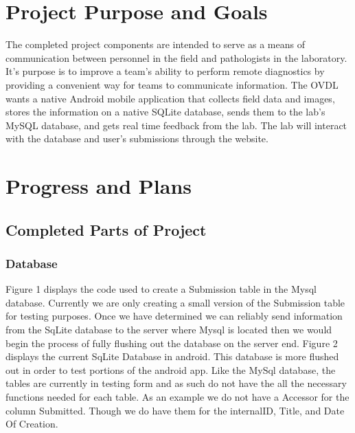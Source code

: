 \documentclass[onecolumn, draftclsnofoot,10pt, compsoc]{IEEEtran}
\begin{document}
\begin{titlepage}
\begin{singlespace}
\begin{abstract}
        \end{abstract}     
    \end{singlespace}
\end{titlepage}
\newpage
{}
\tableofcontents
\clearpage

\section{Project Purpose and Goals}
The completed project components are intended to serve as a means of communication between personnel in the field and pathologists in the laboratory. It's purpose is to improve a team's ability to perform remote diagnostics by providing a convenient way for teams to communicate information. The OVDL wants a native Android mobile application that collects field data and images, stores the information on a native SQLite database, sends them to the lab’s MySQL database, and gets real time feedback from the lab. The lab will interact with the database and user's submissions through the website.

\section{Progress and Plans}
\subsection{Completed Parts of Project}
\subsubsection{Database}
Figure 1 displays the code used to create a Submission table in the Mysql database. Currently we are only creating a small version of the Submission table for testing purposes. Once we have determined we can reliably send information from the SqLite database to the server where Mysql is located then we would begin the process of fully flushing out the database on the server end. Figure 2 displays the current SqLite Database in android. This database is more flushed out in order to test portions of the android app. Like the MySql database, the tables are currently in testing form and as such do not have the all the necessary functions needed for each table. As an example we do not have a Accessor for the column Submitted. Though we do have them for the internalID, Title, and Date Of Creation. 
\end{document}
